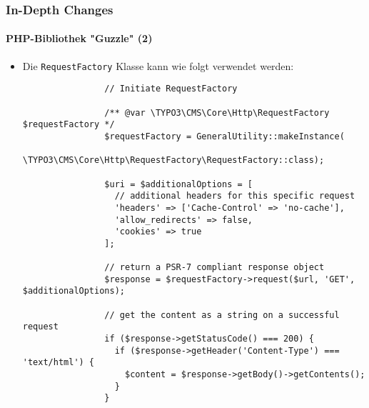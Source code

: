 \begin{frame}[fragile]
	\frametitle{In-Depth Changes}
	\framesubtitle{PHP-Bibliothek "Guzzle" (2)}

	\lstset{basicstyle=\tiny\ttfamily}

	\begin{itemize}

		\item Die \texttt{RequestFactory} Klasse kann wie folgt verwendet werden:

			\begin{lstlisting}
				// Initiate RequestFactory

				/** @var \TYPO3\CMS\Core\Http\RequestFactory $requestFactory */
				$requestFactory = GeneralUtility::makeInstance(
				  \TYPO3\CMS\Core\Http\RequestFactory\RequestFactory::class);

				$uri = $additionalOptions = [
				  // additional headers for this specific request
				  'headers' => ['Cache-Control' => 'no-cache'],
				  'allow_redirects' => false,
				  'cookies' => true
				];

				// return a PSR-7 compliant response object
				$response = $requestFactory->request($url, 'GET', $additionalOptions);

				// get the content as a string on a successful request
				if ($response->getStatusCode() === 200) {
				  if ($response->getHeader('Content-Type') === 'text/html') {
				    $content = $response->getBody()->getContents();
				  }
				}
			\end{lstlisting}

	\end{itemize}

\end{frame}

